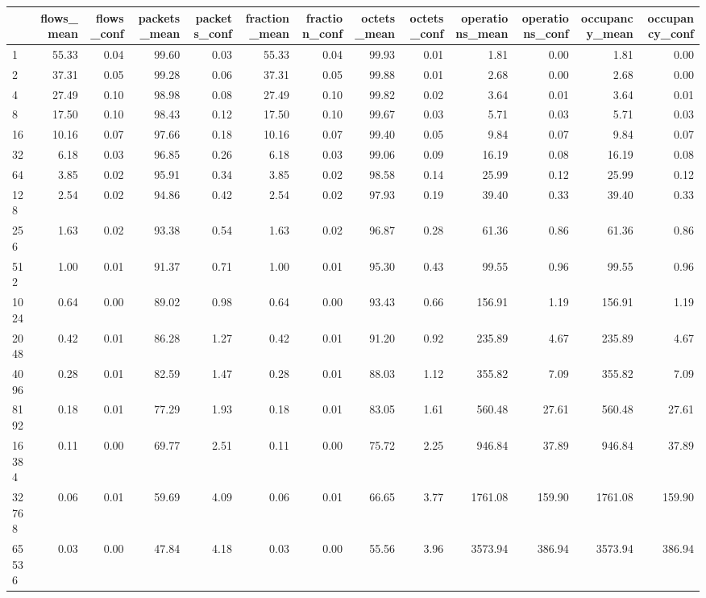 \begin{tabular}{lrrrrrrrrrrrr}
\toprule
 & flows_mean & flows_conf & packets_mean & packets_conf & fraction_mean & fraction_conf & octets_mean & octets_conf & operations_mean & operations_conf & occupancy_mean & occupancy_conf \\
\midrule
1 & 55.33 & 0.04 & 99.60 & 0.03 & 55.33 & 0.04 & 99.93 & 0.01 & 1.81 & 0.00 & 1.81 & 0.00 \\
2 & 37.31 & 0.05 & 99.28 & 0.06 & 37.31 & 0.05 & 99.88 & 0.01 & 2.68 & 0.00 & 2.68 & 0.00 \\
4 & 27.49 & 0.10 & 98.98 & 0.08 & 27.49 & 0.10 & 99.82 & 0.02 & 3.64 & 0.01 & 3.64 & 0.01 \\
8 & 17.50 & 0.10 & 98.43 & 0.12 & 17.50 & 0.10 & 99.67 & 0.03 & 5.71 & 0.03 & 5.71 & 0.03 \\
16 & 10.16 & 0.07 & 97.66 & 0.18 & 10.16 & 0.07 & 99.40 & 0.05 & 9.84 & 0.07 & 9.84 & 0.07 \\
32 & 6.18 & 0.03 & 96.85 & 0.26 & 6.18 & 0.03 & 99.06 & 0.09 & 16.19 & 0.08 & 16.19 & 0.08 \\
64 & 3.85 & 0.02 & 95.91 & 0.34 & 3.85 & 0.02 & 98.58 & 0.14 & 25.99 & 0.12 & 25.99 & 0.12 \\
128 & 2.54 & 0.02 & 94.86 & 0.42 & 2.54 & 0.02 & 97.93 & 0.19 & 39.40 & 0.33 & 39.40 & 0.33 \\
256 & 1.63 & 0.02 & 93.38 & 0.54 & 1.63 & 0.02 & 96.87 & 0.28 & 61.36 & 0.86 & 61.36 & 0.86 \\
512 & 1.00 & 0.01 & 91.37 & 0.71 & 1.00 & 0.01 & 95.30 & 0.43 & 99.55 & 0.96 & 99.55 & 0.96 \\
1024 & 0.64 & 0.00 & 89.02 & 0.98 & 0.64 & 0.00 & 93.43 & 0.66 & 156.91 & 1.19 & 156.91 & 1.19 \\
2048 & 0.42 & 0.01 & 86.28 & 1.27 & 0.42 & 0.01 & 91.20 & 0.92 & 235.89 & 4.67 & 235.89 & 4.67 \\
4096 & 0.28 & 0.01 & 82.59 & 1.47 & 0.28 & 0.01 & 88.03 & 1.12 & 355.82 & 7.09 & 355.82 & 7.09 \\
8192 & 0.18 & 0.01 & 77.29 & 1.93 & 0.18 & 0.01 & 83.05 & 1.61 & 560.48 & 27.61 & 560.48 & 27.61 \\
16384 & 0.11 & 0.00 & 69.77 & 2.51 & 0.11 & 0.00 & 75.72 & 2.25 & 946.84 & 37.89 & 946.84 & 37.89 \\
32768 & 0.06 & 0.01 & 59.69 & 4.09 & 0.06 & 0.01 & 66.65 & 3.77 & 1761.08 & 159.90 & 1761.08 & 159.90 \\
65536 & 0.03 & 0.00 & 47.84 & 4.18 & 0.03 & 0.00 & 55.56 & 3.96 & 3573.94 & 386.94 & 3573.94 & 386.94 \\

\end{tabular}
